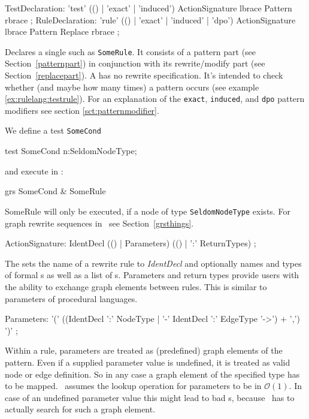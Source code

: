 \begin{rail}
  TestDeclaration: 'test' (() | 'exact' | 'induced') ActionSignature lbrace Pattern rbrace ;
  RuleDeclaration: 'rule' (() | 'exact' | 'induced' | 'dpo') ActionSignature lbrace Pattern Replace rbrace ;
\end{rail}
Declares a single  such as \texttt{SomeRule}. 
It consists of a pattern part (see Section~\ref{patternpart}) in conjunction with its rewrite/modify part (see Section~\ref{replacepart}). 
A  has no rewrite specification. 
It's intended to check whether (and maybe how many times) a pattern occurs (see example \ref{ex:rulelang:testrule}).
For an explanation of the \texttt{exact}, \texttt{induced}, and \texttt{dpo} pattern modifiers see section \ref{sct:patternmodifier}. 
\begin{example}
\label{ex:rulelang:testrule}
We define a test \texttt{SomeCond}
\begin{grgen}
test SomeCond {
  n:SeldomNodeType;
}
\end{grgen}
and execute in \GrShell:
\begin{grshell}
  grs SomeCond & SomeRule
\end{grshell}
SomeRule will only be executed, if a node of type \texttt{SeldomNodeType} exists. For graph rewrite sequences in \GrShell\ see Section~\ref{grsthings}.
\end{example}

\begin{rail}  
  ActionSignature: IdentDecl (() | Parameters) (() | ':' ReturnTypes) ;
\end{rail}
The  sets the name of a rewrite rule to \emph{IdentDecl} and optionally names and types of formal s as well as a list of s. Parameters and return types provide users with the ability to exchange graph elements between rules. This is similar to parameters of procedural languages.

\begin{rail}
  Parameters: '(' ((IdentDecl ':' NodeType | '-' IdentDecl ':' EdgeType '->') + ',') ')' ;
\end{rail}
Within a rule, parameters are treated as (predefined) graph elements of the pattern. Even if a supplied parameter value is undefined, it is treated as valid node or edge definition. So in any case a graph element of the specified type has to be mapped. \GrG\ assumes the lookup operation for parameters to be in $\mathcal{O}(1)$. In case of an undefined parameter value this might lead to bad s, because \GrG\ has to actually search for such a graph element.

